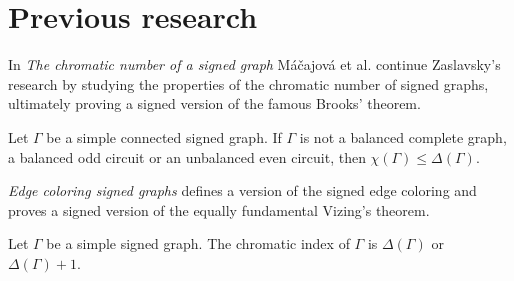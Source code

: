 \section{Previous research}

In \textit{The chromatic number of a signed graph}\cite{chromatic-number} Máčajová et al. continue Zaslavsky's research by studying the properties of the chromatic number of signed graphs, ultimately proving a signed version of the famous Brooks'\cite{brooks} theorem.

\begin{theorem}\label{th:brooks}
    Let $\Gamma$ be a simple connected signed graph. If $\Gamma$ is not a balanced complete graph, a balanced odd circuit or an unbalanced even circuit, then $\chi(\Gamma) \leq \Delta(\Gamma)$.
\end{theorem}

\textit{Edge coloring signed graphs} defines a version of the signed edge coloring and proves a signed version of the equally fundamental Vizing's theorem.

\begin{theorem}\label{th:vizing}
    Let $\Gamma$ be a simple signed graph. The chromatic index of $\Gamma$ is $\Delta(\Gamma)$ or $\Delta(\Gamma) + 1$.
\end{theorem}

\todo{}
